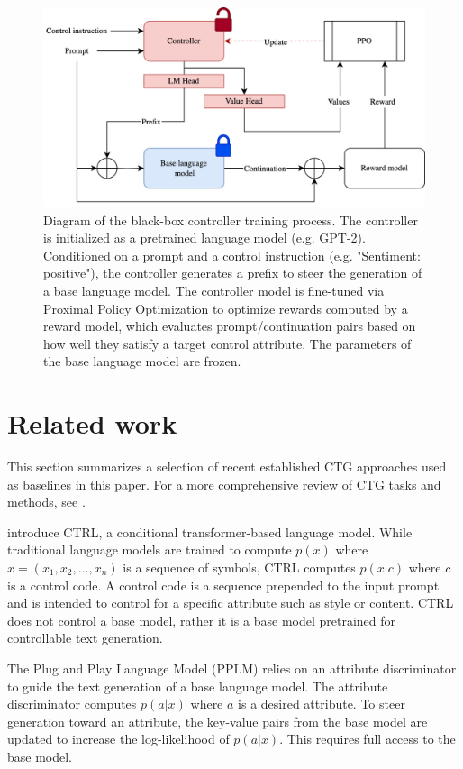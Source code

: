 \documentclass[phd,electronic,oneside,twosidetoc,letterpaper,chaptercenter,parttop,lof]{byumsphd}
\begin{document}
\begin{figure}[t!]
    \centering
    \includegraphics[width=0.75\linewidth]{images/bbc/system_diagram_value_head.png}
    \caption[System diagram with value head]{Diagram of the black-box controller training process. The controller is initialized as a pretrained language model (e.g. GPT-2). Conditioned on a prompt and a control instruction (e.g. "Sentiment: positive"), the controller generates a prefix to steer the generation of a base language model. The controller model is fine-tuned via Proximal Policy Optimization to optimize rewards computed by a reward model, which evaluates prompt/continuation pairs based on how well they satisfy a target control attribute. The parameters of the base language model are frozen.}
    \label{fig:system_diagram}\vspace{12pt}
\end{figure}

\section{Related work}
\label{related_work}

This section summarizes a selection of recent established CTG approaches used as baselines in this paper.
For a more comprehensive review of CTG tasks and methods, see \citep{zhang2023survey}.

\citet{keskar2019ctrl} introduce CTRL, a conditional transformer-based language model.
While traditional language models are trained to compute \(p(x)\) where \(x = (x_1, x_2, \ldots, x_n)\) is a sequence of symbols, CTRL  computes \(p(x | c)\) where \(c\) is a control code.
A control code is a sequence prepended to the input prompt and is intended to control for a specific attribute such as style or content.
CTRL does not control a base model, rather it is a base model pretrained for controllable text generation.

The Plug and Play Language Model (PPLM) \cite{dathathri2020plug} relies on an attribute discriminator to guide the text generation of a base language model.
The attribute discriminator computes \(p(a | x)\) where \(a\) is a desired attribute.
To steer generation toward an attribute, the key-value pairs from the base model are updated to increase the log-likelihood of \(p(a | x)\).
This requires full access to the base model.
\end{document}
